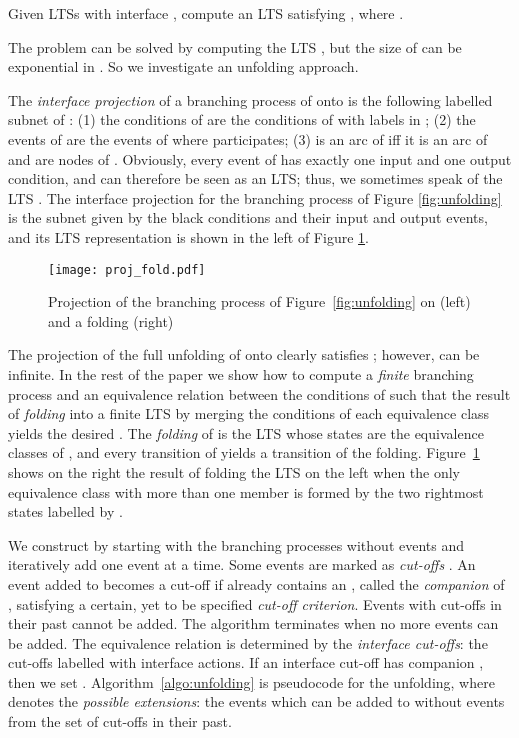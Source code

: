 \documentclass{llncs}
\begin{document}
\begin{definition}
Given LTSs  with interface ,
compute an LTS  satisfying , 
where . 
\end{definition}

The problem can be solved by computing the LTS , but the size of  
can be exponential in . So we investigate an unfolding approach. 

The {\em interface projection}  of a branching process  of  onto 
 is the following labelled subnet of :
(1) the conditions of  are the conditions of  with labels in ;
(2) the events of  are the events of   where  participates;
(3)  is an arc of  if{}f it is an arc of  and  are nodes of .
Obviously, every event of  has exactly one
input and one output condition, and  can therefore be seen as an LTS; thus, we sometimes
speak of the LTS . The interface projection  for the branching process of 
Figure \ref{fig:unfolding} is the subnet given by the black conditions and their input and output 
events, and its LTS representation is shown in the left of Figure \ref{fig:projection}. 


\begin{figure}[htbp]
\centering
\texttt{[image: proj\_fold.pdf]}
\caption{Projection of the branching process of Figure~\ref{fig:unfolding} on 
 (left) and a folding (right)}\label{fig:projection}
\end{figure}

The projection  of the full unfolding of  onto  clearly 
satisfies ; however,  can be
infinite. In the rest of the paper we show how to compute a 
{\em finite} branching process  and an equivalence relation  between the 
conditions of  such that the result of {\em folding}  into a finite 
LTS by merging the conditions of each equivalence class yields the desired . 
The {\em folding} of  
is the LTS whose states are
the equivalence classes of , and every transition  of  yields a 
transition  of the folding.
Figure~\ref{fig:projection} shows on the right
the result of folding the LTS on the left 
when the only equivalence class with more than one member is formed by the two rightmost states labelled by .

We construct  by starting with the branching processes without events and
iteratively add one event at a time.
Some events are marked as {\em cut-offs} \cite{Esparza08}. An event  added to  becomes 
a cut-off if  already contains an , called the {\em companion} of , satisfying 
a certain, yet to be specified \emph{cut-off criterion}. Events with cut-offs
in their past cannot be added. The algorithm 
terminates when no more events can be added. 
The equivalence relation  is determined by the {\em interface cut-offs}: the cut-offs labelled with interface actions. 
If an interface cut-off  has companion , then we set . 
Algorithm~\ref{algo:unfolding} is pseudocode for the unfolding, where
 denotes the 
{\em possible extensions}: the events which can be added to  without
events from the set  of cut-offs in their past.
\end{document}
